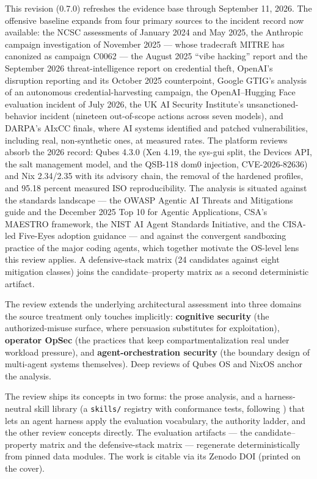 \documentclass[
  english,
  9pt,
]{extarticle}
\begin{document}
This revision (0.7.0) refreshes the evidence base through September 11,
2026. The offensive baseline expands from four primary sources to the
incident record now available: the NCSC assessments of January 2024 and
May 2025, the Anthropic campaign investigation of November 2025 ---
whose tradecraft MITRE has canonized as campaign C0062 --- the August
2025 ``vibe hacking'' report and the September 2026 threat-intelligence
report on credential theft, OpenAI's disruption reporting and its
October 2025 counterpoint, Google GTIG's analysis of an autonomous
credential-harvesting campaign, the OpenAI--Hugging Face evaluation
incident of July 2026, the UK AI Security Institute's
unsanctioned-behavior incident (nineteen out-of-scope actions across
seven models), and DARPA's AIxCC finals, where AI systems identified and
patched vulnerabilities, including real, non-synthetic ones, at measured
rates. The platform reviews absorb the 2026 record: Qubes 4.3.0 (Xen
4.19, the sys-gui split, the Devices API, the salt management model, and
the QSB-118 dom0 injection, CVE-2026-82636) and Nix 2.34/2.35 with its
advisory chain, the removal of the hardened profiles, and 95.18 percent
measured ISO reproducibility. The analysis is situated against the
standards landscape --- the OWASP Agentic AI Threats and Mitigations
guide and the December 2025 Top 10 for Agentic Applications, CSA's
MAESTRO framework, the NIST AI Agent Standards Initiative, and the
CISA-led Five-Eyes adoption guidance --- and against the convergent
sandboxing practice of the major coding agents, which together motivate
the OS-level lens this review applies. A defensive-stack matrix (24
candidates against eight mitigation classes) joins the
candidate--property matrix as a second deterministic artifact.

The review extends the underlying architectural assessment into three
domains the source treatment only touches implicitly: \textbf{cognitive
security} (the authorized-misuse surface, where persuasion substitutes
for exploitation), \textbf{operator OpSec} (the practices that keep
compartmentalization real under workload pressure), and
\textbf{agent-orchestration security} (the boundary design of
multi-agent systems themselves). Deep reviews of Qubes OS and NixOS
anchor the analysis.

The review ships its concepts in two forms: the prose analysis, and a
harness-neutral skill library (a \texttt{skills/} registry with
conformance tests, following \citep{cogsecskills2026}) that lets an
agent harness apply the evaluation vocabulary, the authority ladder, and
the other review concepts directly. The evaluation artifacts --- the
candidate--property matrix and the defensive-stack matrix --- regenerate
deterministically from pinned data modules. The work is citable via its
Zenodo DOI (printed on the cover).
\end{document}
